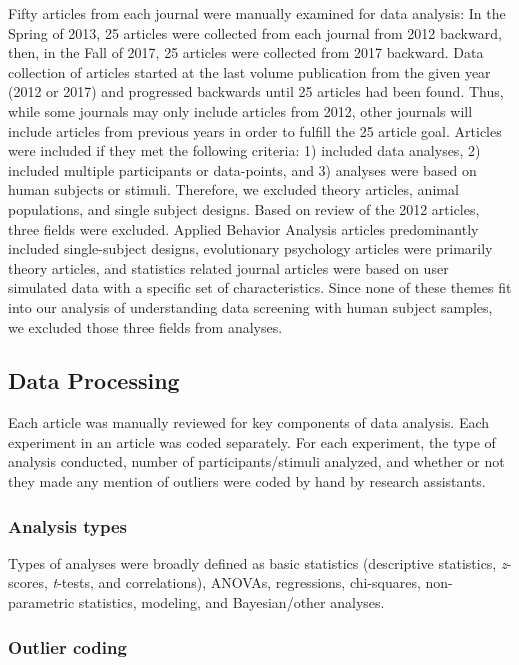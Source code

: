 \documentclass[english,,man,mask]{apa6}
\theoremstyle{definition}
\theoremstyle{definition}
\theoremstyle{definition}
\theoremstyle{remark}
\begin{document}
Fifty articles from each journal were manually examined for data
analysis: In the Spring of 2013, 25 articles were collected from each
journal from 2012 backward, then, in the Fall of 2017, 25 articles were
collected from 2017 backward. Data collection of articles started at the
last volume publication from the given year (2012 or 2017) and
progressed backwards until 25 articles had been found. Thus, while some
journals may only include articles from 2012, other journals will
include articles from previous years in order to fulfill the 25 article
goal. Articles were included if they met the following criteria: 1)
included data analyses, 2) included multiple participants or
data-points, and 3) analyses were based on human subjects or stimuli.
Therefore, we excluded theory articles, animal populations, and single
subject designs. Based on review of the 2012 articles, three fields were
excluded. Applied Behavior Analysis articles predominantly included
single-subject designs, evolutionary psychology articles were primarily
theory articles, and statistics related journal articles were based on
user simulated data with a specific set of characteristics. Since none
of these themes fit into our analysis of understanding data screening
with human subject samples, we excluded those three fields from
analyses.

\subsection{Data Processing}\label{data-processing}

Each article was manually reviewed for key components of data analysis.
Each experiment in an article was coded separately. For each experiment,
the type of analysis conducted, number of participants/stimuli analyzed,
and whether or not they made any mention of outliers were coded by hand
by research assistants.

\subsubsection{Analysis types}\label{analysis-types}

Types of analyses were broadly defined as basic statistics (descriptive
statistics, \emph{z}-scores, \emph{t}-tests, and correlations), ANOVAs,
regressions, chi-squares, non-parametric statistics, modeling, and
Bayesian/other analyses.

\subsubsection{Outlier coding}\label{outlier-coding}
\end{document}
